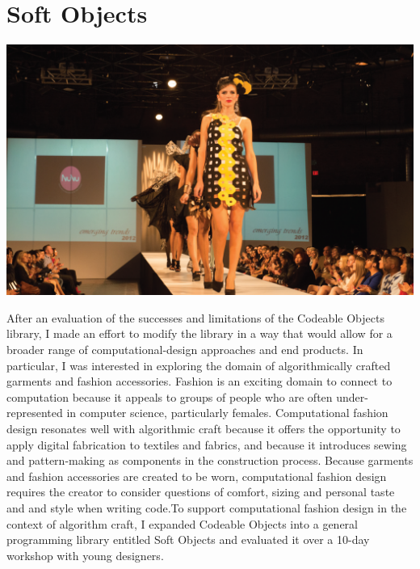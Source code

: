 \chapter{Soft Objects}
	
	\begin{center}
\includegraphics[width=6.5in]{images/fashion_show.png}
\end{center}
	
After an evaluation of the successes and limitations of the Codeable Objects library, I made an effort to modify the library in a way that would allow for a broader range of computational-design approaches and end products. In particular, I was interested in exploring the domain of algorithmically crafted garments and fashion accessories. Fashion is an exciting domain to connect to computation because it appeals to groups of people who are often under-represented in computer science, particularly females. Computational fashion design resonates well with algorithmic craft because it offers the opportunity to apply digital fabrication to textiles and fabrics, and because it introduces sewing and pattern-making as components in the construction process. Because garments and fashion accessories are created to be worn, computational fashion design requires the creator to consider questions of comfort, sizing and personal taste and and style when writing code.To support computational fashion design in the context of algorithm craft, I expanded Codeable Objects into a general programming library entitled Soft Objects and evaluated it over a 10-day workshop with young designers.


